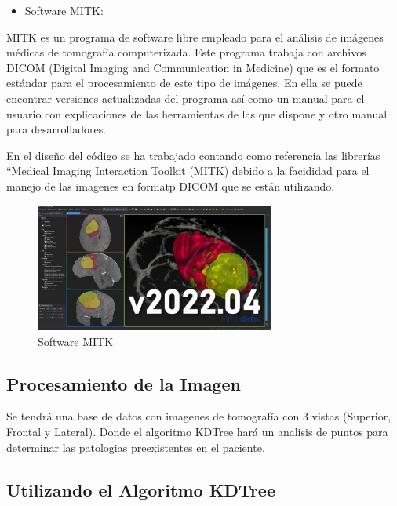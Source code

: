 \documentclass{article}
\begin{document}
\begin{itemize}
            \item Software MITK:
\end{itemize}

MITK es un programa de software libre empleado para el análisis de imágenes médicas de
tomografía computerizada. Este programa trabaja con archivos DICOM (Digital Imaging and
Communication in Medicine) que es el formato estándar para el procesamiento de este tipo de
imágenes. En ella se puede encontrar versiones actualizadas del programa así como un manual para el usuario con explicaciones de las herramientas de las que dispone y otro manual para desarrolladores.

En el diseño del código se ha trabajado contando como referencia las librerías “Medical Imaging Interaction Toolkit (MITK) debido a la facididad para el manejo de las imagenes en formatp DICOM que se están utilizando.

\begin{figure}[H]
\centering
\includegraphics[width=0.7\textwidth]{img/MITK.jpg}
\caption{Software MITK}
\end{figure}

\subsection{Procesamiento de la Imagen}

Se tendrá una base de datos con imagenes de tomografía con 3 vistas (Superior, Frontal y Lateral). Donde el algoritmo KDTree hará un analisis de puntos para determinar las patologias preexistentes en el paciente.

\subsection{Utilizando el Algoritmo KDTree}
\end{document}
